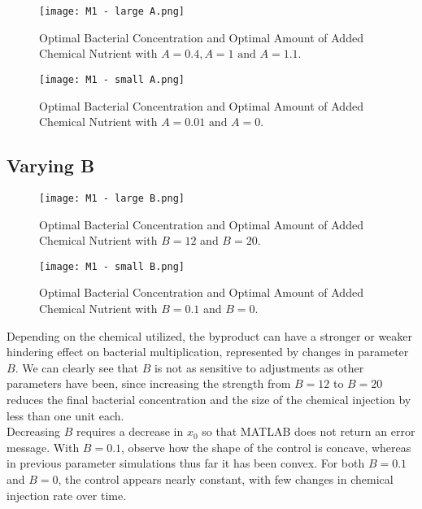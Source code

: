\documentclass[10pt]{article}
\theoremstyle{exmp}
\begin{document}
\begin{figure}[h!tbp]
\centering
\texttt{[image: M1 - large A.png]}
\caption{Optimal Bacterial Concentration and Optimal Amount of Added Chemical Nutrient with $A = 0.4, A = 1 \text{ and } A = 1.1$.}
\label{fig:bA}
\end{figure}

\begin{figure}[h!tbp]
\centering
\texttt{[image: M1 - small A.png]}
\caption{Optimal Bacterial Concentration and Optimal Amount of Added Chemical Nutrient with $A = 0.01 \text{ and } A = 0$.}
\label{fig:sA}
\end{figure}

\newpage
\subsection{Varying B}

\begin{figure}[h!tbp]
    \centering
    \texttt{[image: M1 - large B.png]}
    \caption{Optimal Bacterial Concentration and Optimal Amount of Added Chemical Nutrient with $B = 12$ and $B = 20$.}
    \label{fig:lB}
\end{figure}

\begin{figure}[h!tbp]
    \centering
    \texttt{[image: M1 - small B.png]}
    \caption{Optimal Bacterial Concentration and Optimal Amount of Added Chemical Nutrient with $B = 0.1$ and $B = 0$.}
    \label{fig:sB}
\end{figure}

\noindent Depending on the chemical utilized, the byproduct can have a stronger or weaker hindering effect on bacterial multiplication, represented by changes in parameter $B$. We can clearly see that $B$ is not as sensitive to adjustments as other parameters have been, since increasing the strength from $B = 12$ to $B = 20$ reduces the final bacterial concentration and the size of the chemical injection by less than one unit each. \\

\noindent Decreasing $B$ requires a decrease in $x_0$ so that MATLAB does not return an error message. With $B = 0.1$, observe how the shape of the control is concave, whereas in previous parameter simulations thus far it has been convex. For both $B = 0.1$ and $B = 0$, the control appears nearly constant, with few changes in chemical injection rate over time.   \\
\end{document}
